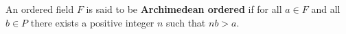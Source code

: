 An ordered field \(F\) is said to be \textbf{Archimedean ordered} if for all \(a \in F\) and all \(b \in P\) there exists a positive integer \(n\) such that \(nb > a\).